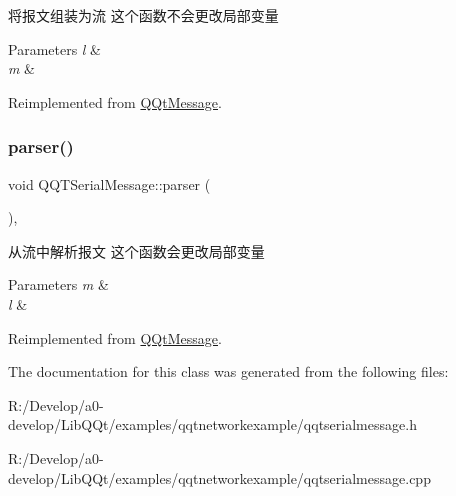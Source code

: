 将报文组装为流 这个函数不会更改局部变量 


\begin{DoxyParams}{Parameters}
{\em l} & \\
\hline
{\em m} & \\
\hline
\end{DoxyParams}


Reimplemented from \mbox{\hyperlink{class_q_qt_message_af1885c2c3628495808dca66ee8d72e14}{Q\+Qt\+Message}}.

\mbox{\label{class_q_q_t_serial_message_a9533887dc0566c5ee16990b323df94ef}} 
\subsubsection{\texorpdfstring{parser()}{parser()}}
{\footnotesize\ttfamily void Q\+Q\+T\+Serial\+Message\+::parser (\begin{DoxyParamCaption}\item[{const Q\+Byte\+Array \&}]{ }\end{DoxyParamCaption})\hspace{0.3cm}{\ttfamily [override]}, {\ttfamily [virtual]}}



从流中解析报文 这个函数会更改局部变量 


\begin{DoxyParams}{Parameters}
{\em m} & \\
\hline
{\em l} & \\
\hline
\end{DoxyParams}


Reimplemented from \mbox{\hyperlink{class_q_qt_message_a0bc25669bdd61490b1d8df6d77565f31}{Q\+Qt\+Message}}.



The documentation for this class was generated from the following files\+:\begin{DoxyCompactItemize}
\item 
R\+:/\+Develop/a0-\/develop/\+Lib\+Q\+Qt/examples/qqtnetworkexample/qqtserialmessage.\+h\item 
R\+:/\+Develop/a0-\/develop/\+Lib\+Q\+Qt/examples/qqtnetworkexample/qqtserialmessage.\+cpp\end{DoxyCompactItemize}
